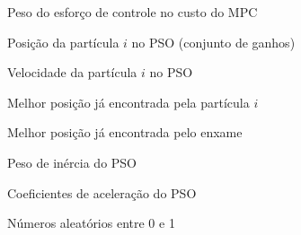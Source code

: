 \begin{simbolos}
  \item[$ \lambda $] Peso do esforço de controle no custo do MPC
  \item[$ \mathbf{x}_i $] Posição da partícula $i$ no PSO (conjunto de ganhos)
  \item[$ \mathbf{v}_i $] Velocidade da partícula $i$ no PSO
  \item[$ \mathbf{p}_i $] Melhor posição já encontrada pela partícula $i$
  \item[$ \mathbf{g} $] Melhor posição já encontrada pelo enxame
  \item[$ w $] Peso de inércia do PSO
  \item[$ c_1,\ c_2 $] Coeficientes de aceleração do PSO
  \item[$ r_1,\ r_2 $] Números aleatórios entre 0 e 1
\end{simbolos}
